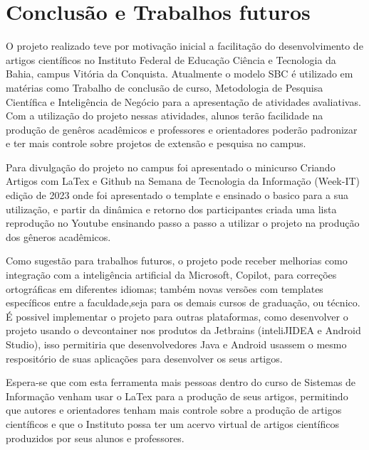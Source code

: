 \section{Conclusão e Trabalhos futuros}

O projeto realizado teve por motivação inicial a facilitação do desenvolvimento de artigos científicos no Instituto Federal de Educação Ciência e Tecnologia da Bahia, campus Vitória da Conquista. Atualmente o modelo SBC é utilizado em matérias como Trabalho de conclusão de curso, Metodologia de Pesquisa Científica e Inteligência de Negócio para a apresentação de atividades avaliativas. Com a utilização do projeto nessas atividades, alunos terão facilidade na produção de genêros acadêmicos e professores e orientadores poderão padronizar e ter mais controle sobre projetos de extensão e pesquisa no campus.

Para divulgação do projeto no campus foi apresentado o minicurso Criando Artigos com LaTex e Github na Semana de Tecnologia da Informação (Week-IT) edição de 2023 onde foi apresentado o template e ensinado o basico para a sua utilização, e partir da dinâmica e retorno dos participantes criada uma lista reprodução no Youtube ensinando passo a passo a utilizar o projeto na produção dos gêneros acadêmicos.

Como sugestão para trabalhos futuros, o projeto pode receber melhorias como integração com a inteligência artificial da Microsoft, Copilot, para correções ortográficas em diferentes idiomas; também novas versões com templates específicos entre a faculdade,seja para os demais cursos de graduação, ou técnico. É possivel implementar o projeto para outras plataformas, como desenvolver o projeto usando o devcontainer nos produtos da Jetbrains (inteliJIDEA e Android Studio), isso permitiria que desenvolvedores Java e Android usassem o mesmo respositório de suas aplicações para desenvolver os seus artigos.

Espera-se que com esta ferramenta mais pessoas dentro do curso de Sistemas de Informação venham usar o LaTex para a produção de seus artigos, permitindo que autores e orientadores tenham mais controle sobre a produção de artigos científicos e que o Instituto possa ter um acervo virtual de artigos científicos produzidos por seus alunos e professores.
